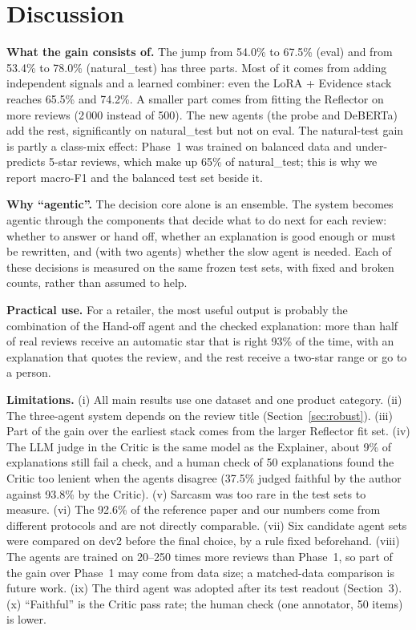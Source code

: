 \documentclass[runningheads]{llncs}
\begin{document}
\section{Discussion}

\textbf{What the gain consists of.} The jump from 54.0\% to 67.5\% (eval) and from 53.4\% to 78.0\% (natural\_test) has three parts. Most of it comes from adding independent signals and a learned combiner: even the LoRA + Evidence stack reaches 65.5\% and 74.2\%. A smaller part comes from fitting the Reflector on more reviews (2\,000 instead of 500). The new agents (the probe and DeBERTa) add the rest, significantly on natural\_test but not on eval. The natural-test gain is partly a class-mix effect: Phase~1 was trained on balanced data and under-predicts 5-star reviews, which make up 65\% of natural\_test; this is why we report macro-F1 and the balanced test set beside it.

\textbf{Why ``agentic''.} The decision core alone is an ensemble. The system becomes agentic through the components that decide what to do next for each review: whether to answer or hand off, whether an explanation is good enough or must be rewritten, and (with two agents) whether the slow agent is needed. Each of these decisions is measured on the same frozen test sets, with fixed and broken counts, rather than assumed to help.

\textbf{Practical use.} For a retailer, the most useful output is probably the combination of the Hand-off agent and the checked explanation: more than half of real reviews receive an automatic star that is right 93\% of the time, with an explanation that quotes the review, and the rest receive a two-star range or go to a person.

\textbf{Limitations.} (i) All main results use one dataset and one product category. (ii) The three-agent system depends on the review title (Section~\ref{sec:robust}). (iii) Part of the gain over the earliest stack comes from the larger Reflector fit set. (iv) The LLM judge in the Critic is the same model as the Explainer, about 9\% of explanations still fail a check, and a human check of 50 explanations found the Critic too lenient when the agents disagree (37.5\% judged faithful by the author against 93.8\% by the Critic). (v) Sarcasm was too rare in the test sets to measure. (vi) The 92.6\% of the reference paper and our numbers come from different protocols and are not directly comparable. (vii) Six candidate agent sets were compared on dev2 before the final choice, by a rule fixed beforehand. (viii) The agents are trained on 20--250 times more reviews than Phase~1, so part of the gain over Phase~1 may come from data size; a matched-data comparison is future work. (ix) The third agent was adopted after its test readout (Section~3). (x) ``Faithful'' is the Critic pass rate; the human check (one annotator, 50 items) is lower.
\end{document}
